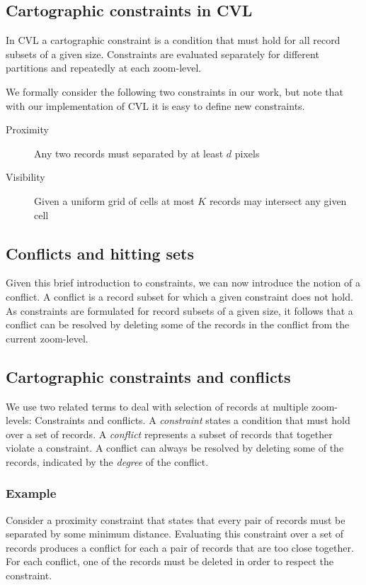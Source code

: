 \subsection{Cartographic constraints in CVL}

In CVL a cartographic constraint is a condition that must hold for all record subsets of a given size. Constraints are evaluated separately for different partitions and repeatedly at each zoom-level.

We formally consider the following two constraints in our work, but note that with our implementation of CVL it is easy to define new constraints. 

\begin{description}
\item [Proximity] Any two records must separated by at least $d$ pixels
\item [Visibility] Given a uniform grid of cells at most $K$ records may intersect any given cell
\end{description}

\subsection{Conflicts and hitting sets}

Given this brief introduction to constraints, we can now introduce the notion of a conflict. 
A conflict is a record subset for which a given constraint does not hold. As constraints are formulated for record subsets of a given size, it follows that a conflict can be resolved by deleting some of the records in the conflict from the current zoom-level.


\subsection{Cartographic constraints and conflicts}

We use two related terms to deal with selection of records at multiple zoom-levels: Constraints and conflicts. A \emph{constraint} states a condition that must hold over a set of records. A \emph{conflict} represents a subset of records that together violate a constraint. A conflict can always be resolved by deleting some of the records, indicated by the \emph{degree} of the conflict.

\subsubsection{Example}
Consider a proximity constraint that states that every pair of records must be separated by some minimum distance. Evaluating this constraint over a set of records produces a conflict for each a pair of records that are too close together. For each conflict, one of the records must be deleted in order to respect the constraint.

